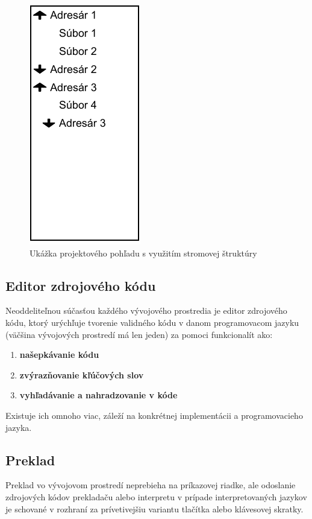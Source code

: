 	\begin{figure}[H]
		\label{fig:ui-project-pane}
		\centering
		\includegraphics[scale=0.75]{obrazky-figures/UI-project-pane}
		\caption{Ukážka projektového pohľadu s využitím stromovej štruktúry}
	\end{figure}
	
	
	\subsection{Editor zdrojového kódu}
	\label{sec:TR-code-editor}
	Neoddeliteľnou súčasťou každého vývojového prostredia je editor zdrojového kódu, ktorý urýchľuje tvorenie validného kódu v danom programovacom jazyku (väčšina vývojových prostredí má len jeden) za pomoci funkcionalít ako:
	\begin{enumerate}
		\item \textbf{našepkávanie kódu}
		\item \textbf{zvýrazňovanie kľúčových slov}
		\item \textbf{vyhľadávanie a nahradzovanie v kóde}
	\end{enumerate}

	Existuje ich omnoho viac, záleží na konkrétnej implementácii a programovacieho jazyka.
	
	\subsection{Preklad}
	Preklad vo vývojovom prostredí neprebieha na príkazovej riadke, ale odoslanie zdrojových kódov prekladaču alebo interpretu v prípade interpretovaných jazykov je schované v rozhraní za prívetivejšiu variantu tlačítka alebo klávesovej skratky.
	
